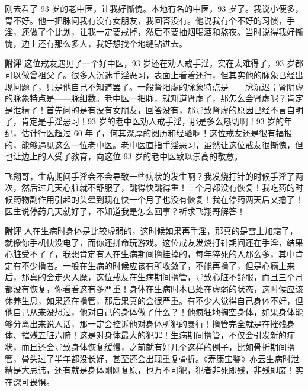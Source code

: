 \begin{case}
    刚去看了 93 岁的老中医，让我好惭愧。本地有名的中医，93 岁了。我说小便多，胃不好。他一把脉问我有没有女朋友，我回答没有。他说我有个不好的习惯，手淫，还做了个比划，让我一定要戒掉，然后不要抽烟喝酒和熬夜。当时说得我好惭愧，边上还有那么多人，我好想找个地缝钻进去。

    \textbf{附评} 这位戒友遇见了一个好中医，93 岁还在劝人戒手淫，实在太难得了，93 岁都可以做曾祖父了。很多人沉迷手淫恶习，表面上看着还行，但其实他的脉象已经出现问题了，只是他自己不知道罢了。一般肾阳虚的脉象特点是——脉沉迟；肾阴虚的脉象特点是——脉细数。老中医一把脉，就知道肾虚了，那怎么会肾虚呢？肯定是泄精了！首先问的是有没有女朋友，回答没有，那导致肾虚的原因已经不言自明了，肯定是手淫恶习！93 岁的老中医劝人戒手淫，那是多么恳切啊！93 岁的年纪，估计行医超过 60 年了，何其深厚的阅历和经验啊！这位戒友还是很有福报的，能够遇见这么一位老中医。老中医直指手淫恶习，虽然让这位戒友很惭愧，但也让边上的人受了教育，向这位 93 岁的老中医致以崇高的敬意。
\end{case}

\begin{case}
    飞翔哥，生病期间手淫会不会导致一些病状的发生啊？我发烧打针的时候手淫了两次，然后过几天心脏就不舒服了，跳得快跳得重！三个月都没有恢复！我吃药的时候药物副作用引起的头晕到现在快一个月了也没有恢复！我在停药两天后又撸了！医生说停药几天就好了，不知道我是怎么回事？祈求飞翔哥解答！

    \textbf{附评} 人在生病时身体是比较虚弱的，这时候如果再手淫，那真的是雪上加霜了，就像你手机快没电了，而你还拼命玩游戏。这位戒友发烧打针期间还在手淫，结果心脏受不了了，我想肯定有人在生病期间撸挂掉的，每年猝死的人那么多，其中肯定有不少撸者。一般在生病的时候应该有所收敛了，不能再撸了，但是心瘾上来后，那真的会走火入魔，这位戒友在生病期间撸管，导致心脏不舒服，而且三个月都没有恢复，你看看这有多严重！身体在生病时本已处在虚弱的状态，这时候应该休养生息，如果还在撸管，那后果真的会很严重。有不少人觉得自己身体不好，但他自己从来没想过，他对自己的身体做了什么？！他疯狂地掏空身体，如果身体能够分离出来说人话，那一定会控诉他对身体所犯的暴行！撸管完全就是在摧残身体、摧残五脏六腑！这是对身体最大的犯罪！生病期间撸管，不仅会引发新的症状，而且还会导致身体恢复缓慢，之前就有好几个这样的例子，比如骨折期间撸管，骨头过了半年都没长好，甚至还会出现重复骨折。《寿康宝鉴》亦云生病时泄精是大忌讳，还有就是身体刚刚复原，也万不可犯，犯者非死即残，非残即废！实在深可畏惧。
\end{case}

